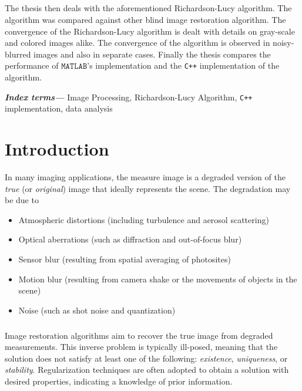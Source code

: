\documentclass[a4paper]{book}
\providecommand{\keywords}[1]{\textbf{\textit{Index terms---}} #1}
\begin{document}
\paragraph*{}The thesis then deals with the aforementioned Richardson-Lucy algorithm. The algorithm was compared against other blind image restoration algorithm. The convergence of the Richardson-Lucy algorithm is dealt with details on gray-scale and colored images alike. The convergence of the algorithm is observed in noisy-blurred images and also in separate cases. Finally the thesis compares the performance of $  \mathtt{MATLAB}$'s implementation and the \texttt{C++} implementation of the algorithm.

\keywords{Image Processing, Richardson-Lucy Algorithm, \texttt{C++} implementation, data analysis}
\cleardoublepage

\tableofcontents
\cleardoublepage
{}
\listoffigures
\cleardoublepage
\mainmatter
	\chapter[\LARGE Introduction]{Introduction}
	\thispagestyle{empty}
	In many imaging applications, the measure image is a degraded version of the \textit{true} (or \textit{original}) image that ideally represents the scene. The degradation may be due to 
	\begin{itemize}
		\item Atmospheric distortions (including turbulence and aerosol scattering)
		\item Optical aberrations (such as diffraction and out-of-focus blur)
		\item Sensor blur (resulting from spatial averaging of photosites)
		\item Motion blur (resulting from camera shake or the movements of objects in the scene)
		\item Noise (such as shot noise and quantization)
	\end{itemize}
	\paragraph*{}Image restoration algorithms aim to recover the true image from degraded measurements. This inverse problem is typically ill-posed, meaning that the solution does not satisfy at least one of the following: \textit{existence}, \textit{uniqueness}, or \textit{stability}. Regularization techniques are often adopted to obtain a solution with desired properties, indicating a knowledge of prior information.
\end{document}

